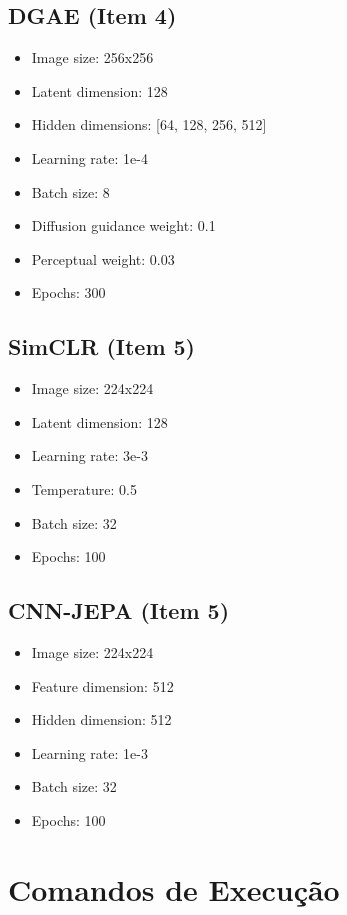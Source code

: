 \subsection{DGAE (Item 4)}

\begin{itemize}
    \item Image size: 256x256
    \item Latent dimension: 128
    \item Hidden dimensions: [64, 128, 256, 512]
    \item Learning rate: 1e-4
    \item Batch size: 8
    \item Diffusion guidance weight: 0.1
    \item Perceptual weight: 0.03
    \item Epochs: 300
\end{itemize}

\subsection{SimCLR (Item 5)}

\begin{itemize}
    \item Image size: 224x224
    \item Latent dimension: 128
    \item Learning rate: 3e-3
    \item Temperature: 0.5
    \item Batch size: 32
    \item Epochs: 100
\end{itemize}

\subsection{CNN-JEPA (Item 5)}

\begin{itemize}
    \item Image size: 224x224
    \item Feature dimension: 512
    \item Hidden dimension: 512
    \item Learning rate: 1e-3
    \item Batch size: 32
    \item Epochs: 100
\end{itemize}

\section{Comandos de Execução}

